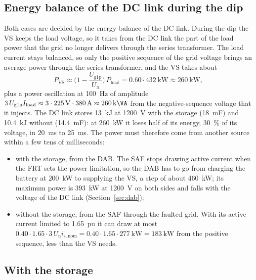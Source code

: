 \documentclass[11pt,a4paper]{scrartcl}
\newcommand{\ped}[1]{_{\mathrm{#1}}}
\begin{document}
\begin{onehalfspace}
\subsection{Energy balance of the DC link during the dip}
\label{sec:res_energy}

Both cases are decided by the energy balance of the DC link. During the dip the VS keeps the load voltage, so it takes from the DC link the part of the load power that the grid no longer delivers through the series transformer. The load current stays balanced, so only the positive sequence of the grid voltage brings an average power through the series transformer, and the VS takes about
\begin{equation}
	P\ped{VS} \approx \Big(1 - \frac{U\ped{g1p}}{U\ped{n}}\Big)\,P\ped{load} = 0.60 \cdot \SI{432}{\kilo\watt} \approx \SI{260}{\kilo\watt},
	\label{eq:pvs}
\end{equation}
plus a power oscillation at \SI{100}{Hz} of amplitude $3\,U\ped{g1n} I\ped{load} \approx 3 \cdot \SI{225}{V} \cdot \SI{380}{A} \approx \SI{260}{\kilo\VA}$ from the negative-sequence voltage that it injects. The DC link stores \SI{13}{kJ} at \SI{1200}{V} with the storage (\SI{18}{mF}) and \SI{10.4}{kJ} without (\SI{14.4}{mF}): at \SI{260}{\kilo\watt} it loses half of its energy, \SI{30}{\percent} of its voltage, in \SI{20}{ms} to \SI{25}{ms}. The power must therefore come from another source within a few tens of milliseconds:
\begin{itemize}[nosep]
	\item with the storage, from the DAB. The SAF stops drawing active current when the FRT sets the power limitation, so the DAB has to go from charging the battery at \SI{200}{\kilo\watt} to supplying the VS, a step of about \SI{460}{\kilo\watt}; its maximum power is \SI{393}{\kilo\watt} at \SI{1200}{V} on both sides and falls with the voltage of the DC link (Section~\ref{sec:dab});
	\item without the storage, from the SAF through the faulted grid. With its active current limited to \SI{1.65}{pu} it can draw at most $0.40 \cdot 1.65 \cdot 3\,U\ped{n} i\ped{s,nom} = 0.40 \cdot 1.65 \cdot \SI{277}{\kilo\watt} = \SI{183}{\kilo\watt}$ from the positive sequence, less than the VS needs.
\end{itemize}

\subsection{With the storage}
\label{sec:res_storage}


\end{onehalfspace}
\end{document}
